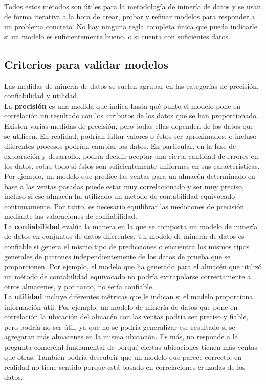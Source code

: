 \documentclass[a4paper, 11pt]{article} %
\begin{document}
Todos estos métodos son útiles para la metodología de minería de datos y se usan de forma iterativa a la hora de crear, probar y refinar modelos para responder a un problema concreto. No hay ninguna regla completa única que pueda indicarle si un modelo es suficientemente bueno, o si cuenta con suficientes datos.

\subsection*{Criterios para validar modelos}

Las medidas de minería de datos se suelen agrupar en las categorías de precisión, confiabilidad y utilidad.\\

La \textbf{precisión} es una medida que indica hasta qué punto el modelo pone en correlación un resultado con los atributos de los datos que se han proporcionado. Existen varias medidas de precisión, pero todas ellas dependen de los datos que se utilicen. En realidad, podrían faltar valores o éstos ser aproximados, o incluso diferentes procesos podrían cambiar los datos. En particular, en la fase de exploración y desarrollo, podría decidir aceptar una cierta cantidad de errores en los datos, sobre todo si éstos son suficientemente uniformes en sus características. Por ejemplo, un modelo que predice las ventas para un almacén determinado en base a las ventas pasadas puede estar muy correlacionado y ser muy preciso, incluso si ese almacén ha utilizado un método de contabilidad equivocado continuamente. Por tanto, es necesario equilibrar las mediciones de precisión mediante las valoraciones de confiabilidad.\\

La \textbf{confiabilidad} evalúa la manera en la que se comporta un modelo de minería de datos en conjuntos de datos diferentes. Un modelo de minería de datos es confiable si genera el mismo tipo de predicciones o encuentra los mismos tipos generales de patrones independientemente de los datos de prueba que se proporcionen. Por ejemplo, el modelo que ha generado para el almacén que utilizó un método de contabilidad equivocado no podría extrapolarse correctamente a otros almacenes, y por tanto, no sería confiable.\\

La \textbf{utilidad} incluye diferentes métricas que le indican si el modelo proporciona información útil. Por ejemplo, un modelo de minería de datos que pone en correlación la ubicación del almacén con las ventas podría ser preciso y fiable, pero podría no ser útil, ya que no se podría generalizar ese resultado si se agregaran más almacenes en la misma ubicación. Es más, no responde a la pregunta comercial fundamental de porqué ciertas ubicaciones tienen más ventas que otras. También podría descubrir que un modelo que parece correcto, en realidad no tiene sentido porque está basado en correlaciones cruzadas de los datos.
\end{document}
